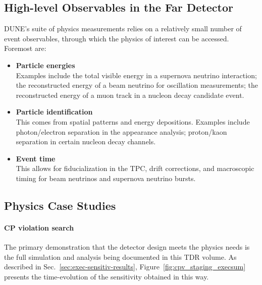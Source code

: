 \subsection{High-level Observables in the Far Detector}

DUNE's suite of physics measurements relies on a relatively small
number of event observables, through which the physics of interest
can be accessed.  Foremost are:
%                                                                                                
\begin{itemize}
\item {\bf Particle energies}  \\
Examples include the total visible energy in a supernova
neutrino interaction; the reconstructed energy of a beam
neutrino for oscillation measurements; the reconstructed
energy of a muon track in a nucleon decay candidate event.

\item {\bf Particle identification}  \\
This comes from spatial patterns and energy depositions.
Examples include photon/electron separation in the \nue{}
appearance analysis; proton/kaon separation in certain
nucleon decay channels.

\item {\bf Event time} \\
This allows for fiducialization
in the TPC, drift corrections, and macroscopic timing for
beam neutrinos and supernova neutrino bursts.
\end{itemize}



\subsection{Physics Case Studies}

\paragraph{\bf CP violation search}
The primary demonstration that the detector design meets
the physics needs is the full simulation and analysis
being documented in this TDR volume.  As described in 
Sec.~\ref{sec:exec-sensitiv-results}, 
Figure~\ref{fig:cpv_staging_execsum}
presents the time-evolution of the  sensitivity 
obtained in this way.


